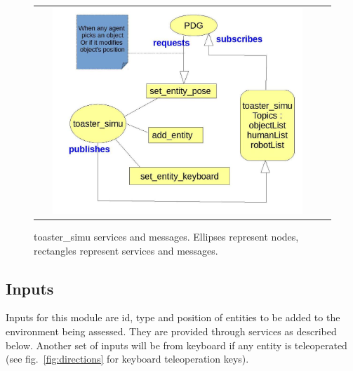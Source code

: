 \documentclass[a4paper]{article}
\begin{document}
 \begin{figure}[ht!]
 \centering
 \begin{tabular}{cc}
  \includegraphics[width=0.9\textwidth]{img/toasterSimu.jpg}
 \end{tabular}
 \caption{toaster\_simu services and messages. Ellipses represent nodes, rectangles represent services and messages.}
 \label{fig:toastersimu}
 \end{figure}



\subsection{Inputs}
Inputs for this module are id, type and position of entities to be added to the environment being assessed. They are provided through services as described below. Another set of inputs will be from keyboard if any entity is teleoperated (see fig.~\ref{fig:directions} for keyboard teleoperation keys).
\end{document}
